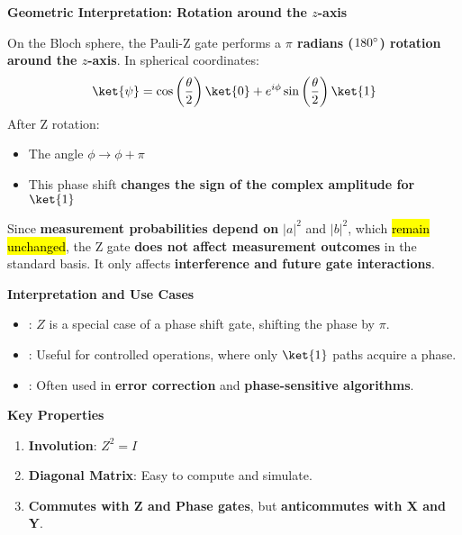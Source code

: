 \highspace
\begin{flushleft}
    \textcolor{Green3}{ \textbf{Geometric Interpretation: Rotation around the $z$-axis}}
\end{flushleft}
On the Bloch sphere, the Pauli-Z gate performs a \textbf{$\pi$ radians ($180\degree$) rotation around the $z$-axis}. In spherical coordinates:
\begin{equation*}
    \ket{\psi} = \cos\left(\dfrac{\theta}{2}\right)\ket{0} + e^{i \phi} \sin\left(\dfrac{\theta}{2}\right)\ket{1}
\end{equation*}
After Z rotation:
\begin{itemize}
    \item The angle $\phi \rightarrow \phi + \pi$
    \item This phase shift \textbf{changes the sign of the complex amplitude for} $\ket{1}$
\end{itemize}
Since \textbf{measurement probabilities depend on} $\left|a\right|^{2}$ and $\left|b\right|^{2}$, which \hl{remain unchanged}, the Z gate \textbf{does not affect measurement outcomes} in the standard basis. It only affects \textbf{interference and future gate interactions}.

\highspace
\begin{flushleft}
    \textcolor{Green3}{ \textbf{Interpretation and Use Cases}}
\end{flushleft}
\begin{itemize}
    \item {}: $Z$ is a special case of a phase shift gate, shifting the phase by $\pi$.
    \item {}: Useful for controlled operations, where only $\ket{1}$ paths acquire a phase.
    \item {}: Often used in \textbf{error correction} and \textbf{phase-sensitive algorithms}.
\end{itemize}

\highspace
\begin{flushleft}
    \textcolor{Green3}{ \textbf{Key Properties}}
\end{flushleft}
\begin{enumerate}
    \item \textbf{Involution}: $Z^{2} = I$
    \item \textbf{Diagonal Matrix}: Easy to compute and simulate.
    \item \textbf{Commutes with Z and Phase gates}, but \textbf{anticommutes with X and Y}.
\end{enumerate}